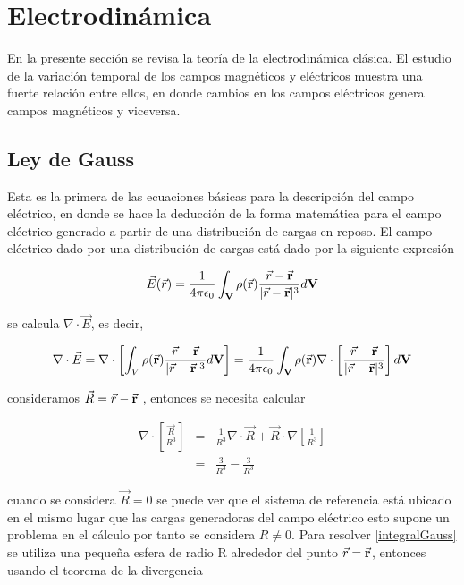 \setcounter{page}{1}
\chapter{Electrodinámica}

\noindent En la presente sección se revisa la teoría de la  electrodinámica clásica. El estudio de la variación temporal de los campos magnéticos y eléctricos muestra una fuerte relación entre ellos, en donde cambios en los campos eléctricos genera campos magnéticos y viceversa.%

\section{Ley de Gauss}

\noindent Esta es la primera de las ecuaciones básicas para la descripción del campo eléctrico, en donde se hace la deducción de la forma matemática para el campo eléctrico generado a partir de una distribución de cargas en reposo. El campo eléctrico dado por una distribución de cargas está dado por la siguiente expresión \cite{Jackson}

\begin{eqnarray}
    \vec{E}(\vec{r}) =\frac{1}{4\pi\epsilon_{0}} \int_{\bf{V}}\rho(\vec{\bf{r}}
)\frac{\vec{r}-\vec{\bf{r}}}{|\vec{r}-\vec{\bf{r}}|^{3}}d\bf{V}
\end{eqnarray}

\noindent se calcula $\nabla \cdot \vec{E}$, es decir,

\begin{eqnarray}
\label{integralGauss}
    \nabla \cdot \vec{E} = \nabla\cdot\left[\int_{V}\rho(\vec{\bf{r}}
)\frac{\vec{r}-\vec{\bf{r}}}{|\vec{r}-\vec{\bf{r}}|^{3}}d\bf{V}\right] = \frac{1}{4\pi\epsilon_{0}}\int_{\bf{V}}\rho(\vec{\bf{r}})\nabla\cdot\left[\frac{\vec{r}-\vec{\bf{r}}}{|\vec{r}-\vec{\bf{r}}|^{3}}\right]d\bf{V}
\end{eqnarray}

\noindent consideramos $\vec{R} = \vec{r}-\vec{\bf{r}}$ , entonces se necesita calcular 

\begin{eqnarray}
    \nabla\cdot\left[\frac{\vec{R}}{R^{3}}\right] &=& \frac{1}{R^{3}}\nabla\cdot\vec{R}+\vec{R}\cdot\nabla\left[\frac{1}{R^{3}}\right]\\
    &=&\frac{3}{R^{3}} - \frac{3}{R^{3}} 
\end{eqnarray}

\noindent cuando se considera $\vec{R} = 0$ se puede ver que el sistema de referencia está ubicado en el mismo lugar que las cargas generadoras del campo eléctrico esto supone un problema en el cálculo por tanto se considera $R\neq0$. Para resolver \eqref{integralGauss} se utiliza una pequeña esfera de radio R alrededor del punto $\vec{r}=\vec{\bf{r}}$, entonces usando el teorema de la divergencia \cite{Arfken}

